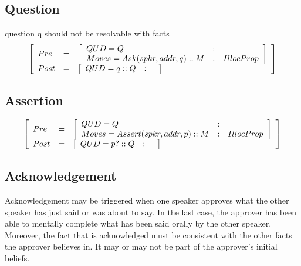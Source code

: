 \documentclass[11pt]{article}
\newenvironment{recenv}
{\left[\begin{array}{lll}}
{\end{array}\right]}
\begin{document}
		\subsection{Question}
			\cite{ginzburg2017}
			question q should not be resolvable with facts
			\begin{equation*}
				\begin{recenv}
					Pre &=& \begin{recenv}
						QUD = Q &:& \\
						Moves = Ask(spkr, addr, q) :: M &:& IllocProp
					\end{recenv}\\
					Post &=& \begin{recenv}
						QUD = q :: Q &:& \\ 
					\end{recenv}
				\end{recenv}
			\end{equation*}
		\subsection{Assertion}
			\begin{equation*}
				\begin{recenv}
					Pre  &=& \begin{recenv}
					QUD = Q &:& \\
						Moves = Assert(spkr, addr, p) :: M &:& IllocProp
					\end{recenv}\\
					Post &=& \begin{recenv}
						QUD = p? :: Q &:& 
					\end{recenv}
				\end{recenv}
			\end{equation*}
		\subsection{Acknowledgement}
			Acknowledgement may be triggered when one speaker approves what the other speaker has just said or was about to say. In the last case, the approver has been able to mentally complete what has been said orally by the other speaker. Moreover, the fact that is acknowledged must be consistent with the other facts the approver believes in. It may or may not be part of the approver's initial  beliefs.
\end{document}
